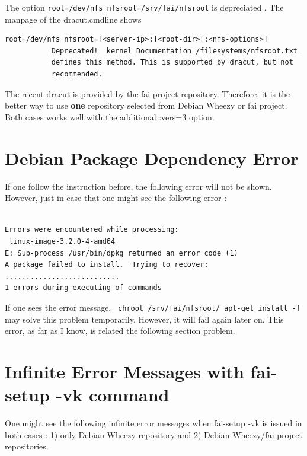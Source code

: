 \documentclass[11pt
  , a4paper
  , article
  , oneside
]{memoir}
\begin{document}
The option \texttt{root=/dev/nfs nfsroot=/srv/fai/nfsroot} is depreciated \citep{dracut}. The manpage of the dracut.cmdline \citep{dracutmanpage} shows 
\begin{lstlisting}
root=/dev/nfs nfsroot=[<server-ip>:]<root-dir>[:<nfs-options>]
           Deprecated!  kernel Documentation_/filesystems/nfsroot.txt_
           defines this method. This is supported by dracut, but not
           recommended.
\end{lstlisting}
The recent dracut is provided by the fai-project repository. Therefore, it is the better way to use \textbf{one} repository selected from Debian Wheezy or fai project. Both cases works well with the additional :vers=3 option.


\section{Debian Package Dependency Error}
If one follow the instruction before, the following error will not be shown. However, just in case that one might see the following error :
\begin{lstlisting}

Errors were encountered while processing:
 linux-image-3.2.0-4-amd64
E: Sub-process /usr/bin/dpkg returned an error code (1)
A package failed to install.  Trying to recover:
...........................
1 errors during executing of commands
\end{lstlisting}
If one sees the error message, \texttt{ chroot /srv/fai/nfsroot/ apt-get install -f} may solve this problem temporarily. However, it will fail again later on. This error, as far as I know, is related the following section problem.

\section{Infinite Error Messages with fai-setup -vk command}
One might see the following infinite error messages when fai-setup -vk is issued in both cases : 1) only Debian Wheezy repository and 2) Debian Wheezy/fai-project repositories. 
\end{document}
